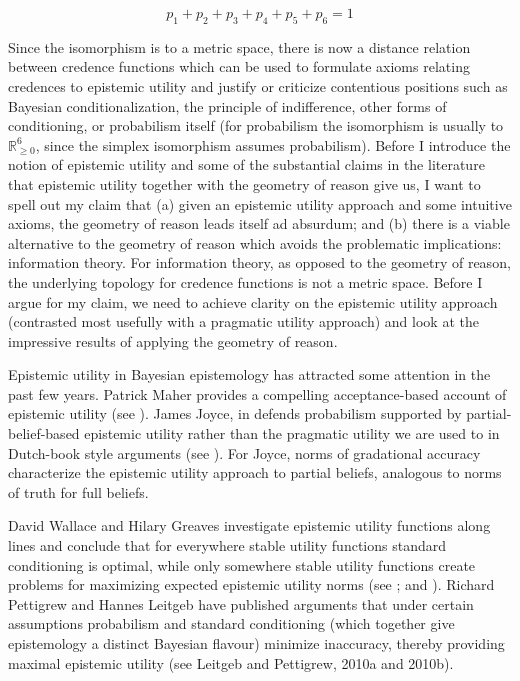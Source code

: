 \documentclass[11pt]{article}
\begin{document}
\begin{equation}
  \label{eq:simplex}
  p_{1}+p_{2}+p_{3}+p_{4}+p_{5}+p_{6}=1
\end{equation}

Since the isomorphism is to a metric space, there is now a distance
relation between credence functions which can be used to formulate
axioms relating credences to epistemic utility and justify or
criticize contentious positions such as Bayesian conditionalization,
the principle of indifference, other forms of conditioning, or
probabilism itself (for probabilism the isomorphism is usually to
$\mathbb{R}_{\geq{}0}^{6}$, since the simplex isomorphism assumes
probabilism). Before I introduce the notion of epistemic utility and
some of the substantial claims in the literature that epistemic
utility together with the geometry of reason give us, I want to spell
out my claim that (a) given an epistemic utility approach and some
intuitive axioms, the geometry of reason leads itself ad absurdum; and
(b) there is a viable alternative to the geometry of reason which
avoids the problematic implications: information theory. For
information theory, as opposed to the geometry of reason, the
underlying topology for credence functions is not a metric space.
Before I argue for my claim, we need to achieve clarity on the
epistemic utility approach (contrasted most usefully with a pragmatic
utility approach) and look at the impressive results of applying the
geometry of reason.

Epistemic utility in Bayesian epistemology has attracted some
attention in the past few years. Patrick Maher provides a compelling
acceptance-based account of epistemic utility (see
). James Joyce, in  defends probabilism supported by
partial-belief-based epistemic utility rather than the pragmatic
utility we are used to in Dutch-book style arguments (see
). For Joyce, norms of gradational accuracy
characterize the epistemic utility approach to partial beliefs,
analogous to norms of truth for full beliefs.

David Wallace and Hilary Greaves investigate epistemic utility
functions along  lines and conclude that for
everywhere stable utility functions standard conditioning is optimal,
while only somewhere stable utility functions create problems for
maximizing expected epistemic utility norms (see
; and ). Richard
Pettigrew and Hannes Leitgeb have published arguments that under
certain assumptions probabilism and standard conditioning (which
together give epistemology a distinct Bayesian flavour) minimize
inaccuracy, thereby providing maximal epistemic utility (see
Leitgeb and Pettigrew, 2010a and
2010b).
\end{document}
